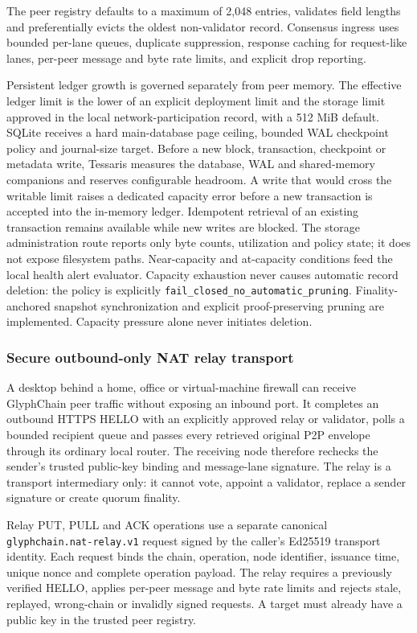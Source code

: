 The peer registry defaults to a maximum of 2,048 entries, validates field
lengths and preferentially evicts the oldest non-validator record. Consensus
ingress uses bounded per-lane queues, duplicate suppression, response caching
for request-like lanes, per-peer message and byte rate limits, and explicit drop
reporting.

Persistent ledger growth is governed separately from peer memory. The effective
ledger limit is the lower of an explicit deployment limit and the storage limit
approved in the local network-participation record, with a 512 MiB default.
SQLite receives a hard main-database page ceiling, bounded WAL checkpoint policy
and journal-size target. Before a new block, transaction, checkpoint or metadata
write, Tessaris measures the database, WAL and shared-memory companions and
reserves configurable headroom. A write that would cross the writable limit
raises a dedicated capacity error before a new transaction is accepted into the
in-memory ledger. Idempotent retrieval of an existing transaction remains
available while new writes are blocked.
The storage administration route reports only byte counts, utilization and
policy state; it does not expose filesystem paths. Near-capacity and at-capacity
conditions feed the local health alert evaluator. Capacity exhaustion never
causes automatic record deletion: the policy is explicitly
\texttt{fail\_closed\_no\_automatic\_pruning}. Finality-anchored snapshot
synchronization and explicit proof-preserving pruning are implemented. Capacity
pressure alone never initiates deletion.

\subsubsection{Secure outbound-only NAT relay transport}

A desktop behind a home, office or virtual-machine firewall can receive
GlyphChain peer traffic without exposing an inbound port. It completes an
outbound HTTPS HELLO with an explicitly approved relay or validator, polls a
bounded recipient queue and passes every retrieved original P2P envelope
through its ordinary local router. The receiving node therefore rechecks the
sender's trusted public-key binding and message-lane signature. The relay is a
transport intermediary only: it cannot vote, appoint a validator, replace a
sender signature or create quorum finality.

Relay PUT, PULL and ACK operations use a separate canonical
\texttt{glyphchain.nat-relay.v1} request signed by the caller's Ed25519
transport identity. Each request binds the chain, operation, node identifier,
issuance time, unique nonce and complete operation payload. The relay requires
a previously verified HELLO, applies per-peer message and byte rate limits and
rejects stale, replayed, wrong-chain or invalidly signed requests. A target must
already have a public key in the trusted peer registry.

